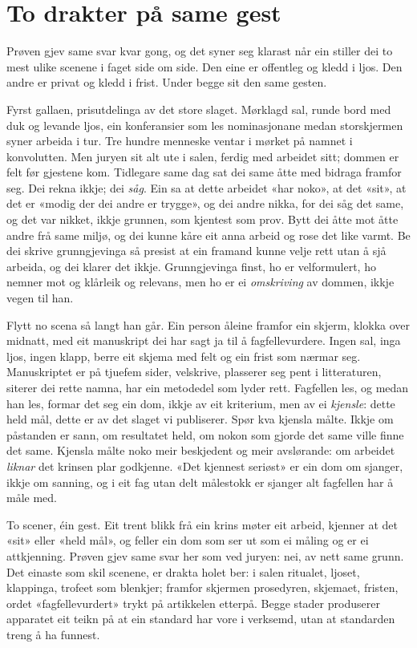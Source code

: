 \section{To drakter på same gest}

Prøven gjev same svar kvar gong, og det syner seg klarast når ein stiller dei to mest ulike scenene i faget side om side. Den eine er offentleg og kledd i ljos. Den andre er privat og kledd i frist. Under begge sit den same gesten.

Fyrst gallaen, prisutdelinga av det store slaget. Mørklagd sal, runde bord med duk og levande ljos, ein konferansier som les nominasjonane medan storskjermen syner arbeida i tur. Tre hundre menneske ventar i mørket på namnet i konvolutten. Men juryen sit alt ute i salen, ferdig med arbeidet sitt; dommen er felt før gjestene kom. Tidlegare same dag sat dei same åtte med bidraga framfor seg. Dei rekna ikkje; dei \emph{såg}. Ein sa at dette arbeidet «har noko», at det «sit», at det er «modig der dei andre er trygge», og dei andre nikka, for dei såg det same, og det var nikket, ikkje grunnen, som kjentest som prov. Bytt dei åtte mot åtte andre frå same miljø, og dei kunne kåre eit anna arbeid og rose det like varmt. Be dei skrive grunngjevinga så presist at ein framand kunne velje rett utan å sjå arbeida, og dei klarer det ikkje. Grunngjevinga finst, ho er velformulert, ho nemner mot og klårleik og relevans, men ho er ei \emph{omskriving} av dommen, ikkje vegen til han.

Flytt no scena så langt han går. Ein person åleine framfor ein skjerm, klokka over midnatt, med eit manuskript dei har sagt ja til å fagfellevurdere. Ingen sal, inga ljos, ingen klapp, berre eit skjema med felt og ein frist som nærmar seg. Manuskriptet er på tjuefem sider, velskrive, plasserer seg pent i litteraturen, siterer dei rette namna, har ein metodedel som lyder rett. Fagfellen les, og medan han les, formar det seg ein dom, ikkje av eit kriterium, men av ei \emph{kjensle}: dette held mål, dette er av det slaget vi publiserer. Spør kva kjensla målte. Ikkje om påstanden er sann, om resultatet held, om nokon som gjorde det same ville finne det same. Kjensla målte noko meir beskjedent og meir avslørande: om arbeidet \emph{liknar} det krinsen plar godkjenne. «Det kjennest seriøst» er ein dom om sjanger, ikkje om sanning, og i eit fag utan delt målestokk er sjanger alt fagfellen har å måle med.

To scener, éin gest. Eit trent blikk frå ein krins møter eit arbeid, kjenner at det «sit» eller «held mål», og feller ein dom som ser ut som ei måling og er ei attkjenning. Prøven gjev same svar her som ved juryen: nei, av nett same grunn. Det einaste som skil scenene, er drakta holet ber: i salen ritualet, ljoset, klappinga, trofeet som blenkjer; framfor skjermen prosedyren, skjemaet, fristen, ordet «fagfellevurdert» trykt på artikkelen etterpå. Begge stader produserer apparatet eit teikn på at ein standard har vore i verksemd, utan at standarden treng å ha funnest.

